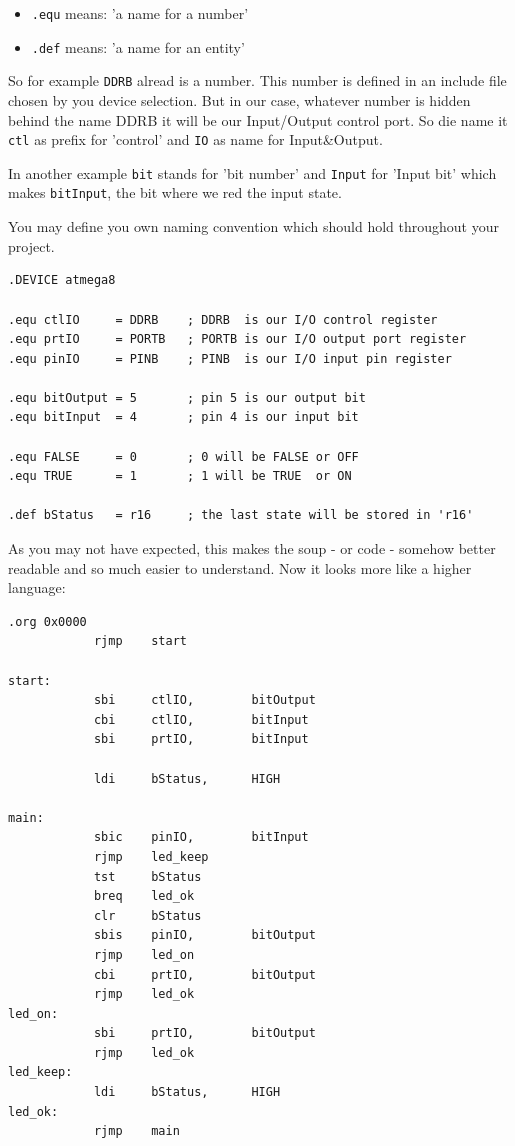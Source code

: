 \begin{itemize}
  \item \texttt{.equ} means: 'a name for a number'
  \item \texttt{.def} means: 'a name for an entity'
\end{itemize}

So for example \texttt{DDRB} alread is a number. This number is defined in an include file chosen by you device selection. But in our case, whatever number is hidden behind the name DDRB it will be our Input/Output control port. So die name it \texttt{ctl} as prefix for 'control' and \texttt{IO} as name for Input\&Output.

In another example \texttt{bit} stands for 'bit number' and \texttt{Input} for 'Input bit' which makes \texttt{bitInput}, the bit where we red the input state.

You may define you own naming convention which should hold throughout your project.

\begin{lstlisting}
.DEVICE atmega8

.equ ctlIO     = DDRB    ; DDRB  is our I/O control register
.equ prtIO     = PORTB   ; PORTB is our I/O output port register
.equ pinIO     = PINB    ; PINB  is our I/O input pin register

.equ bitOutput = 5       ; pin 5 is our output bit
.equ bitInput  = 4       ; pin 4 is our input bit

.equ FALSE     = 0       ; 0 will be FALSE or OFF
.equ TRUE      = 1       ; 1 will be TRUE  or ON

.def bStatus   = r16     ; the last state will be stored in 'r16'
\end{lstlisting}

As you may not have expected, this makes the soup - or code - somehow better readable and so much easier to understand. Now it looks more like a higher language:

\begin{lstlisting}
.org 0x0000
            rjmp    start

start:
            sbi     ctlIO,        bitOutput
            cbi     ctlIO,        bitInput
            sbi     prtIO,        bitInput

            ldi     bStatus,      HIGH

main:
            sbic    pinIO,        bitInput
            rjmp    led_keep
            tst     bStatus
            breq    led_ok
            clr     bStatus
            sbis    pinIO,        bitOutput
            rjmp    led_on
            cbi     prtIO,        bitOutput
            rjmp    led_ok
led_on:
            sbi     prtIO,        bitOutput
            rjmp    led_ok
led_keep:
            ldi     bStatus,      HIGH
led_ok:
            rjmp    main
\end{lstlisting}

